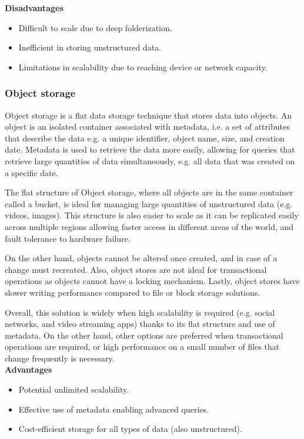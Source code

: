 \noindent\textbf{Disadvantages}
\begin{itemize}
    \item Difficult to scale due to deep folderization.
    \item Inefficient in storing unstructured data.
    \item Limitations in scalability due to reaching device or network capacity.
\end{itemize}

\subsubsection*{Object storage}

Object storage is a flat data storage technique that stores data into objects. An object is an isolated container associated with metadata, i.e. a set of attributes that describe the data e.g. a unique identifier, object name, size, and creation date. Metadata is used to retrieve the data more easily, allowing for queries that retrieve large quantities of data simultaneously, e.g. all data that was created on a specific date. 

The flat structure of Object storage, where all objects are in the same container called a bucket, is ideal for managing large quantities of unstructured data (e.g. videos, images). This structure is also easier to scale as it can be replicated easily across multiple regions allowing faster access in different areas of the world, and fault tolerance to hardware failure.

On the other hand, objects cannot be altered once created, and in case of a change must recreated. Also, object stores are not ideal for transactional operations as objects cannot have a locking mechanism. Lastly, object stores have slower writing performance compared to file or block storage solutions.

Overall, this solution is widely when high scalability is required (e.g. social networks, and video streaming apps) thanks to its flat structure and use of metadata. On the other hand, other options are preferred when transactional operations are required, or high performance on a small number of files that change frequently is necessary. \\[3mm]
\noindent\textbf{Advantages}
\begin{itemize}
    \item Potential unlimited scalability.
    \item Effective use of metadata enabling advanced queries.
    \item Cost-efficient storage for all types of data (also unstructured).
\end{itemize}


